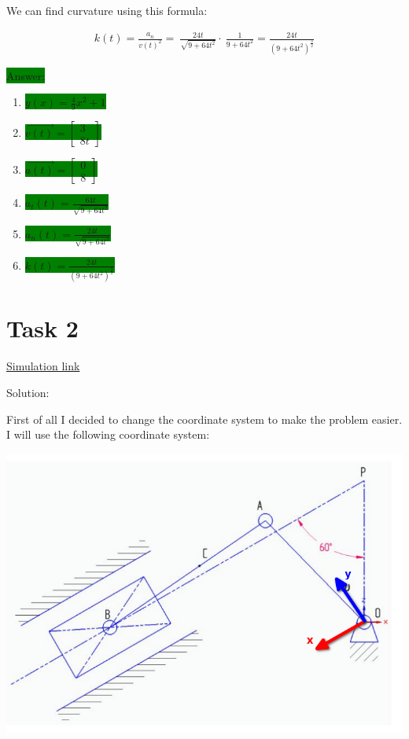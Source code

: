 \documentclass{article}
\begin{document}
We can find curvature using this formula:

\begin{align}
    k(t) = \frac{a_n}{v(t)^2} = \
    \frac{24t}{\sqrt{9 + 64t^2}} \cdot \
    \frac{1}{9 + 64t^2} =
    \frac{24t}{(9 + 64t^2)^\frac{3}{2}}
\end{align}

\colorbox{green}{Answer:}

\begin{enumerate}
    \item \colorbox{green}{$y(x) = \frac{4}{9}x^2 + 1$}
    \item \colorbox{green}{$\vec{v(t)} = \begin{bmatrix}
                      3 \\
                      8t
                  \end{bmatrix}$}
    \item \colorbox{green}{$\vec{a(t)} = \begin{bmatrix}
                      0 \\
                      8
                  \end{bmatrix}$}
    \item \colorbox{green}{$a_t(t) = \frac{64t}{\sqrt{9 + 64t^2}}$}
    \item \colorbox{green}{$a_n(t) = \frac{24t}{\sqrt{9 + 64t^2}}$}
    \item \colorbox{green}{$k(t) = \frac{24t}{(9 + 64t^2)^\frac{3}{2}}$}
\end{enumerate}

\newpage

\section{Task 2}

\href{https://github.com/lvjonok/f22-theoretical-mechanics/blob/master/homework1/motion_task2.gif}{Simulation link}

Solution:

First of all I decided to change the coordinate system to make the problem easier. I will use the following coordinate system:

\includegraphics[width=\textwidth]{newcoordsystem.png}
\end{document}
